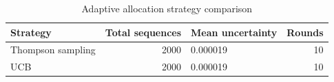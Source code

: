 \begin{table}[!h]
\centering
\caption{\label{tab:tab:surveillance}Adaptive allocation strategy comparison}
\centering
\begin{tabular}[t]{lrlr}
\toprule
Strategy & Total sequences & Mean uncertainty & Rounds\\
\midrule
Thompson sampling & 2000 & 0.000019 & 10\\
UCB & 2000 & 0.000019 & 10\\
\bottomrule
\end{tabular}
\end{table}
